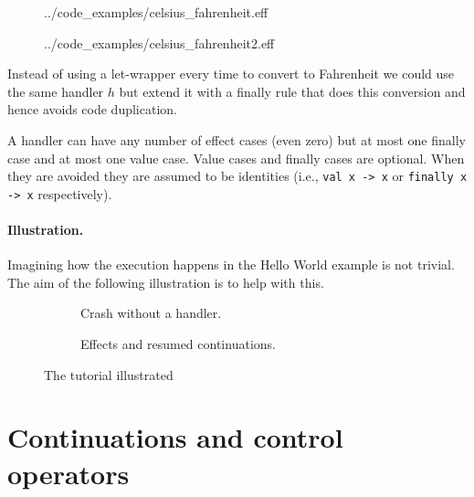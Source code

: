 \documentclass[class=article, crop=false]{standalone}
\begin{document}
\begin{figure}
  \begin{minipage}{.5\textwidth}
    
    {../code_examples/celsius_fahrenheit.eff}
  \end{minipage}%
  \begin{minipage}{.5\textwidth}
    
    {../code_examples/celsius_fahrenheit2.eff}
  \end{minipage}%
\end{figure}

Instead of using a let-wrapper every time to convert to Fahrenheit we could
use the same handler $h$ but extend it with a finally rule that does this
conversion and hence avoids code duplication.

A handler can have any number of effect cases (even zero) but at most one
finally case and at most one value case. Value cases and finally cases are
optional. When they are avoided they are assumed to be identities (i.e.,
\lstinline{val x -> x} or \lstinline{finally x -> x} respectively).

\paragraph{Illustration.}

Imagining how the execution happens in the Hello World example is not trivial.
The aim of the following illustration is to help with this.
\begin{figure}[ht]
\begin{subfigure}{.5\textwidth}
  \centering
  \caption{Crash without a handler.}
  \label{fig:exception}
\end{subfigure}
\begin{subfigure}{.5\textwidth}
  \centering
  \caption{Effects and resumed continuations.}
  \label{fig:exception}
\end{subfigure}
\caption{The tutorial illustrated}
\end{figure}

\section{Continuations and control operators}
\label{sec:continuations}
\end{document}

